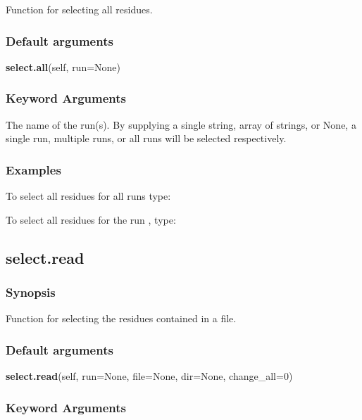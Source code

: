 Function for selecting all residues.

\subsubsection{Default arguments}

\textsf{\textbf{select.all}(self, run=None)}


\subsubsection{Keyword Arguments}

  The name of the run(s).  By supplying a single string, array of strings, or None, a single run, multiple runs, or all runs will be selected respectively.

\subsubsection{Examples}

To select all residues for all runs type:




To select all residues for the run 
, type:





\newpage

\subsection{select.read}


\subsubsection{Synopsis}

Function for selecting the residues contained in a file.

\subsubsection{Default arguments}

\textsf{\textbf{select.read}(self, run=None, file=None, dir=None, change\_all=0)}


\subsubsection{Keyword Arguments}

